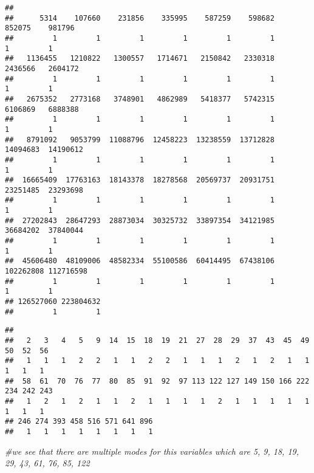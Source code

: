 \documentclass[
]{article}
\newenvironment{Shaded}{\begin{snugshade}}{\end{snugshade}}
\newcommand{\CommentTok}[1]{\textcolor[rgb]{0.56,0.35,0.01}{\textit{#1}}}
\newcommand{\FunctionTok}[1]{\textcolor[rgb]{0.13,0.29,0.53}{\textbf{#1}}}
\newcommand{\NormalTok}[1]{#1}
\newcommand{\SpecialCharTok}[1]{\textcolor[rgb]{0.81,0.36,0.00}{\textbf{#1}}}
\begin{document}
\begin{verbatim}
## 
##      5314    107660    231856    335995    587259    598682    852075    981796 
##         1         1         1         1         1         1         1         1 
##   1136455   1210822   1300557   1714671   2150842   2330318   2436566   2604172 
##         1         1         1         1         1         1         1         1 
##   2675352   2773168   3748901   4862989   5418377   5742315   6106869   6888388 
##         1         1         1         1         1         1         1         1 
##   8791092   9053799  11088796  12458223  13238559  13712828  14094683  14190612 
##         1         1         1         1         1         1         1         1 
##  16665409  17763163  18143378  18278568  20569737  20931751  23251485  23293698 
##         1         1         1         1         1         1         1         1 
##  27202843  28647293  28873034  30325732  33897354  34121985  36684202  37840044 
##         1         1         1         1         1         1         1         1 
##  45606480  48109006  48582334  55100586  60414495  67438106 102262808 112716598 
##         1         1         1         1         1         1         1         1 
## 126527060 223804632 
##         1         1
\end{verbatim}

\begin{Shaded}
\end{Shaded}

\begin{verbatim}
## 
##   2   3   4   5   9  14  15  18  19  21  27  28  29  37  43  45  49  50  52  56 
##   1   1   1   2   2   1   1   2   2   1   1   1   2   1   2   1   1   1   1   1 
##  58  61  70  76  77  80  85  91  92  97 113 122 127 149 150 166 222 234 242 243 
##   1   2   1   2   1   1   2   1   1   1   1   2   1   1   1   1   1   1   1   1 
## 246 274 393 458 516 571 641 896 
##   1   1   1   1   1   1   1   1
\end{verbatim}

\begin{Shaded}
\begin{Highlighting}[]
\CommentTok{\#we see that there are multiple modes for this variables which are 5, 9, 18, 19, 29, 43, 61, 76, 85, 122}
\end{Highlighting}
\end{Shaded}
\end{document}

